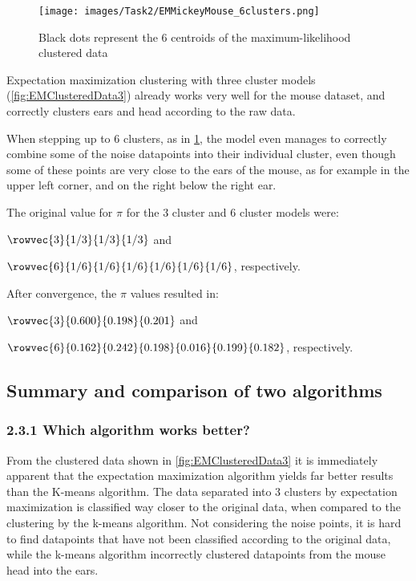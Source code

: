\begin{figure}[H]
	\centering
	\texttt{[image: images/Task2/EMMickeyMouse\_6clusters.png]}
	\caption{Black dots represent the 6 centroids of the maximum-likelihood clustered data}
	\label{fig:EMClusteredData6}
\end{figure}


Expectation maximization clustering with three cluster models (\cref{fig:EMClusteredData3}) already works very well for the mouse dataset, and correctly clusters ears and head according to the raw data.

When stepping up to 6 clusters, as in \cref{fig:EMClusteredData6}, the model even manages to correctly combine some of the noise datapoints into their individual cluster, even though some of these points are very close to the ears of the mouse, as for example in the upper left corner, and on the right below the right ear.

The original value for $\pi$ for the 3 cluster and 6 cluster models were:

 $\rowvec{3}{1/3}{1/3}{1/3}$ and
 
 $\rowvec{6}{1/6}{1/6}{1/6}{1/6}{1/6}{1/6}$, respectively.

After convergence, the $\pi$ values resulted in:

$\rowvec{3}{0.600}{0.198}{0.201}$ and

$\rowvec{6}{0.162}{0.242}{0.198}{0.016}{0.199}{0.182}$, respectively.


\subsection{Summary and comparison of two algorithms}
\subsubsection*{2.3.1 Which algorithm works better?}

From the clustered data shown in \cref{fig:EMClusteredData3} it is immediately apparent that the expectation maximization algorithm yields far better results than the K-means algorithm. The data separated into 3 clusters by expectation maximization is classified way closer to the original data, when compared to the clustering by the k-means algorithm. Not considering the noise points, it is hard to find datapoints that have not been classified according to the original data, while the k-means algorithm incorrectly clustered datapoints from the mouse head into the ears.


